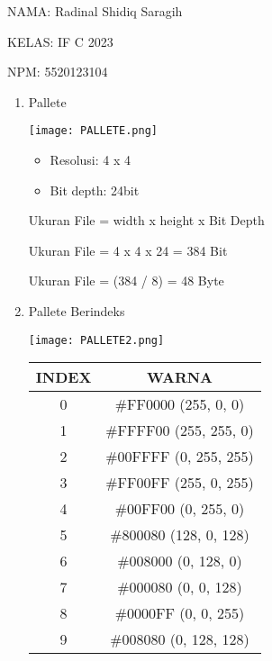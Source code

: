 \documentclass[10pt, a4paper]{article}
\date{}
\begin{document}
NAMA: Radinal Shidiq Saragih

KELAS: IF C 2023

NPM: 5520123104

\begin{enumerate}
  \item Pallete

    \begin{multicols}{2}
      \texttt{[image: PALLETE.png]}

    \begin{center}

      \begin{itemize}
        \item Resolusi: 4 x 4
        \item Bit depth: 24bit
      \end{itemize}

        Ukuran File = width x height x Bit Depth

        Ukuran File = 4 x 4 x 24 = 384 Bit 

        Ukuran File = (384 / 8) = 48 Byte

    \end{center}

    \end{multicols}

  \item Pallete Berindeks

    \begin{multicols}{2}
      \texttt{[image: PALLETE2.png]}
      \begin{center}
        \begin{tabular} {| c | c |}
          \hline
          INDEX & WARNA \\
          \hline
            0 & \#FF0000 (255, 0, 0)   \\
          \hline
            1 & \#FFFF00 (255, 255, 0) \\
          \hline
            2 & \#00FFFF (0, 255, 255) \\
          \hline
            3 & \#FF00FF (255, 0, 255) \\
          \hline
            4 & \#00FF00 (0, 255, 0)   \\
          \hline
            5 & \#800080 (128, 0, 128) \\
          \hline
            6 & \#008000 (0, 128, 0)   \\
          \hline
            7 & \#000080 (0, 0, 128)   \\
          \hline
            8 & \#0000FF (0, 0, 255)   \\
          \hline
            9 & \#008080 (0, 128, 128) \\
          \hline
        \end{tabular}
      \end{center}
    \end{multicols}


\end{enumerate}
\end{document}
